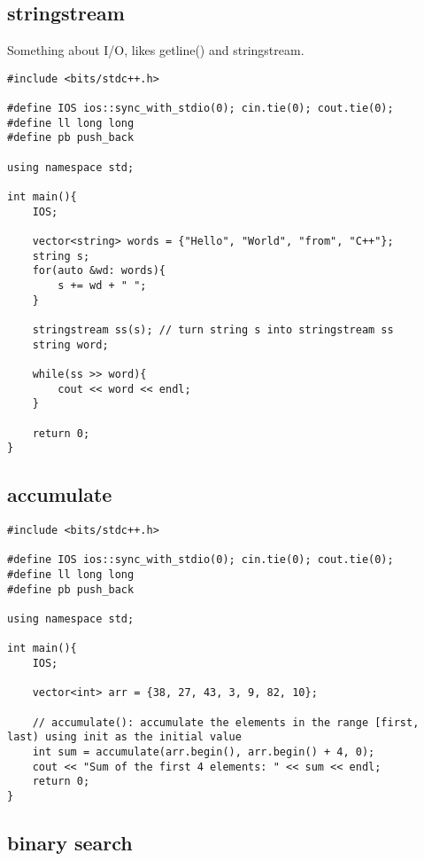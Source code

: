 \documentclass[12pt, a4paper]{article}
\begin{document}
\subsection{stringstream}

Something about I/O, likes getline() and stringstream.

\begin{lstlisting}
#include <bits/stdc++.h>

#define IOS ios::sync_with_stdio(0); cin.tie(0); cout.tie(0);
#define ll long long
#define pb push_back

using namespace std;

int main(){
    IOS;

    vector<string> words = {"Hello", "World", "from", "C++"};
    string s;
    for(auto &wd: words){
        s += wd + " ";
    }

    stringstream ss(s); // turn string s into stringstream ss
    string word;

    while(ss >> word){
        cout << word << endl;
    }
    
    return 0;
}
\end{lstlisting}


\subsection{accumulate}

\begin{lstlisting}
#include <bits/stdc++.h>

#define IOS ios::sync_with_stdio(0); cin.tie(0); cout.tie(0);
#define ll long long
#define pb push_back

using namespace std;

int main(){
    IOS;

    vector<int> arr = {38, 27, 43, 3, 9, 82, 10};

    // accumulate(): accumulate the elements in the range [first, last) using init as the initial value
    int sum = accumulate(arr.begin(), arr.begin() + 4, 0);
    cout << "Sum of the first 4 elements: " << sum << endl;
    return 0;
}
\end{lstlisting}

\subsection{binary search}
\end{document}
